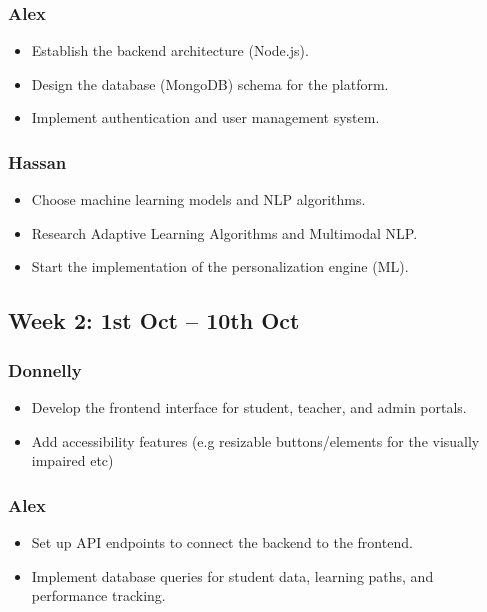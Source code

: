 \documentclass{article}
\begin{document}
\subsubsection{Alex}
\begin{itemize}
    \item Establish the backend architecture (Node.js).
    \item Design the database (MongoDB) schema for the platform.
    \item Implement authentication and user management system.
\end{itemize}

\subsubsection{Hassan}
\begin{itemize}
    \item Choose machine learning models and NLP algorithms.
    \item Research Adaptive Learning Algorithms and Multimodal NLP.
    \item Start the implementation of the personalization engine (ML).
\end{itemize}

\subsection{Week 2: 1st Oct – 10th Oct}
\subsubsection{Donnelly}
\begin{itemize}
    \item Develop the frontend interface for student, teacher, and admin portals.
    \item Add accessibility features (e.g resizable buttons/elements for the visually impaired etc)
\end{itemize}

\subsubsection{Alex}
\begin{itemize}
    \item Set up API endpoints to connect the backend to the frontend.
    \item Implement database queries for student data, learning paths, and performance tracking.
\end{itemize}
\end{document}
